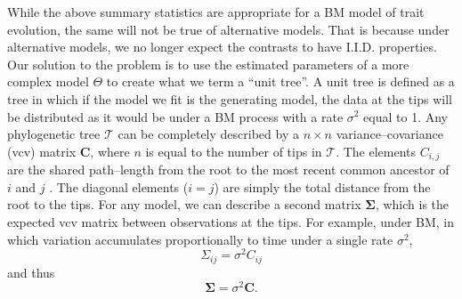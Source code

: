 \documentclass[a4paper,12pt]{article}
\begin{document}
While the above summary statistics are appropriate for a BM model of trait evolution, the same will not be true of alternative models. That is because under alternative models, we no longer expect the contrasts to have I.I.D. properties. Our solution to the problem is to use the estimated parameters of a more complex model $\Theta$ to create what we term a ``unit tree''. A unit tree is defined as a tree in which if the model we fit is the generating model, the data at the tips will be distributed as it would be under a BM process with a rate $\sigma^2$ equal to 1. Any phylogenetic tree $\mathcal{T}$ can be completely described by a $n \times n$ variance--covariance (vcv) matrix $\mathbf{C}$, where $n$ is equal to the number of tips in $\mathcal{T}$. The elements $C_{i,j}$ are the shared path--length from the root to the most recent common ancestor of $i$ and $j$ \citep{Piazza1975}. The diagonal elements ($i = j$) are simply the total distance from the root to the tips. For any model, we can describe a second matrix $\mathbf{\Sigma}$, which is the expected vcv matrix between observations at the tips. For example, under BM, in which variation accumulates proportionally to time under a single rate $\sigma^2$,
\begin{equation}
\Sigma_{ij} = \sigma^2 C_{ij}
\end{equation}
and thus
\begin{equation}
\mathbf{\Sigma} = \sigma^2 \mathbf{C}.
\end{equation}
\end{document}
